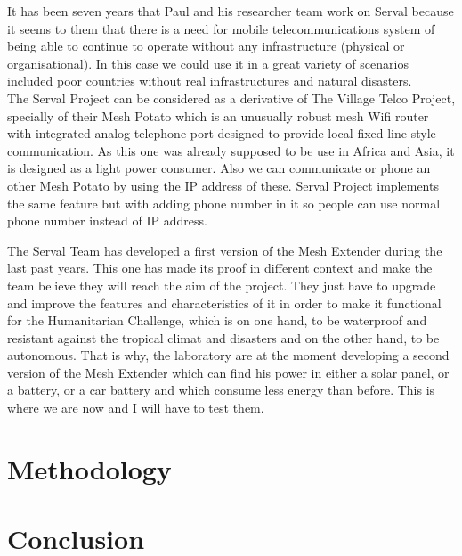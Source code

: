 \documentclass[a4paper, 11pt, oneside]{Thesis}  %
\begin{document}
It has been seven years that Paul and his researcher team work on Serval because it seems to them that there is a need for mobile telecommunications system of being able to continue to operate without any infrastructure (physical or organisational). In this case we could use it in a great variety of scenarios included poor countries without real infrastructures and natural disasters. \\
The Serval Project can be considered as a derivative of The Village Telco Project, specially of their Mesh Potato which is an unusually robust mesh Wifi router with integrated analog telephone port designed to provide local fixed-line style communication. As this one was already supposed to be use in Africa and Asia, it is designed as a light power consumer. Also we can communicate or phone an other Mesh Potato by using the IP address of these. Serval Project implements the same feature but with adding phone number in it so people can use normal phone number instead of IP address. \par
The Serval Team has developed a first version of the Mesh Extender during the last past years. This one has made its proof in different context and make the team believe they will reach the aim of the project. They just have to upgrade and improve the features and characteristics of it in order to make it functional for the Humanitarian Challenge, which is on one hand, to be waterproof and resistant against the tropical climat and disasters and on the other hand, to be autonomous. That is why, the laboratory are at the moment developing a second version of the Mesh Extender which can find his power in either a solar panel, or a battery, or a car battery and which consume less energy than before. This is where we are now and I will have to test them. 


\section{Methodology}
\section{Conclusion}



\backmatter
\end{document}
